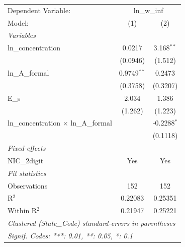 
\begingroup
\centering
\begin{tabular}{lcc}
   \tabularnewline \midrule \midrule
   Dependent Variable: & \multicolumn{2}{c}{ln\_w\_inf}\\
   Model:                                       & (1)           & (2)\\  
   \midrule
   \emph{Variables}\\
   ln\_concentration                            & 0.0217        & 3.168$^{**}$\\   
                                                & (0.0946)      & (1.512)\\   
   ln\_A\_formal                                & 0.9749$^{**}$ & 0.2473\\   
                                                & (0.3758)      & (0.3207)\\   
   E\_s                                         & 2.034         & 1.386\\   
                                                & (1.262)       & (1.223)\\   
   ln\_concentration $\times$ ln\_A\_formal     &               & -0.2288$^{*}$\\   
                                                &               & (0.1118)\\   
   \midrule
   \emph{Fixed-effects}\\
   NIC\_2digit                                  & Yes           & Yes\\  
   \midrule
   \emph{Fit statistics}\\
   Observations                                 & 152           & 152\\  
   R$^2$                                        & 0.22083       & 0.25351\\  
   Within R$^2$                                 & 0.21947       & 0.25221\\  
   \midrule \midrule
   \multicolumn{3}{l}{\emph{Clustered (State\_Code) standard-errors in parentheses}}\\
   \multicolumn{3}{l}{\emph{Signif. Codes: ***: 0.01, **: 0.05, *: 0.1}}\\
\end{tabular}
\par\endgroup


